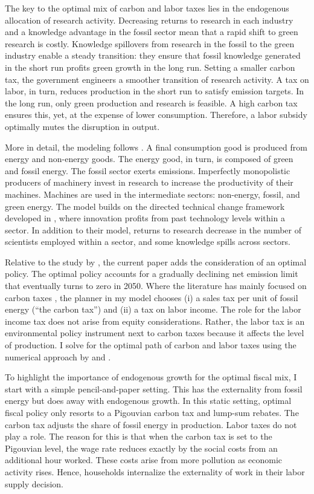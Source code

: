 The key to the optimal mix of carbon and labor taxes lies in the endogenous allocation of research activity. Decreasing returns to  research in each industry and a knowledge advantage in the fossil sector mean that a rapid shift to green research is costly. Knowledge spillovers from research in the fossil to the green industry enable a steady transition: they ensure that fossil knowledge generated in the short run profits green growth in the long run. Setting a smaller carbon tax, the government  engineers a smoother transition of research activity. A tax on labor, in turn, reduces production in the short run to satisfy emission targets. In the long run, only green production and research is feasible. A high carbon tax ensures this, yet, at the expense of lower consumption. Therefore, a labor subsidy optimally mutes the disruption in output.

More in detail, the modeling follows \cite{Fried2018ClimateAnalysis}. A final consumption good is produced from energy and non-energy goods. The energy good, in turn, is composed of green and fossil energy. The fossil sector exerts emissions. Imperfectly monopolistic producers of machinery invest in research to increase the productivity of their machines. Machines are used in the intermediate sectors: non-energy, fossil, and green energy.  The model builds on the directed technical change framework developed in \cite{Acemoglu2012TheChange}, where innovation profits from past technology levels within a sector. In addition to their model, returns to research decrease in the number of scientists employed within a sector, and some knowledge spills across sectors.

Relative to the study by \cite{Fried2018ClimateAnalysis}, the current paper adds the consideration of an optimal policy. The optimal policy accounts for a gradually declining  net emission limit that eventually turns to zero in 2050. Where the literature  has mainly focused on carbon taxes \citep{Fried2018ClimateAnalysis, Barrage2019OptimalPolicy}, the planner in my model chooses (i) a sales tax per unit of fossil energy (“the carbon tax”) and (ii) a tax on labor income. The role for the labor income tax does not arise from equity considerations. Rather, the labor tax is an environmental policy instrument next to carbon taxes because it affects the level of production.  I solve for the optimal path of carbon and labor taxes using the numerical approach by  \cite{Jones1993OptimalGrowth} and \cite{Barrage2019OptimalPolicy}.

To highlight the importance of endogenous growth for the optimal fiscal mix, I start with a simple pencil-and-paper setting. This has the externality from fossil energy but does away with endogenous growth. In this static setting, optimal fiscal policy only resorts to a Pigouvian carbon tax and lump-sum rebates. The carbon tax adjusts the share of fossil energy in production. Labor taxes do not play a role. The reason for this is that when the carbon tax is set to the Pigouvian level, the wage rate reduces exactly by the social costs from an additional hour worked. These costs arise from more pollution as economic activity rises. Hence, households internalize the externality of work in their labor supply decision.

